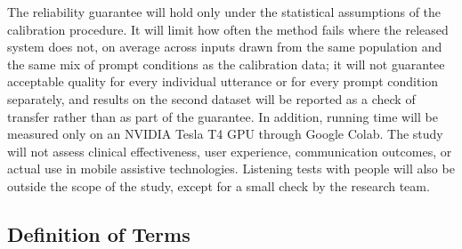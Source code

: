 The reliability guarantee will hold only under the statistical assumptions of the calibration procedure. It will limit how often the method fails where the released system does not, on average across inputs drawn from the same population and the same mix of prompt conditions as the calibration data; it will not guarantee acceptable quality for every individual utterance or for every prompt condition separately, and results on the second dataset will be reported as a check of transfer rather than as part of the guarantee. In addition, running time will be measured only on an NVIDIA Tesla T4 GPU through Google Colab. The study will not assess clinical effectiveness, user experience, communication outcomes, or actual use in mobile assistive technologies. Listening tests with people will also be outside the scope of the study, except for a small check by the research team.

\subsection{Definition of Terms}
\label{sec:terms}

